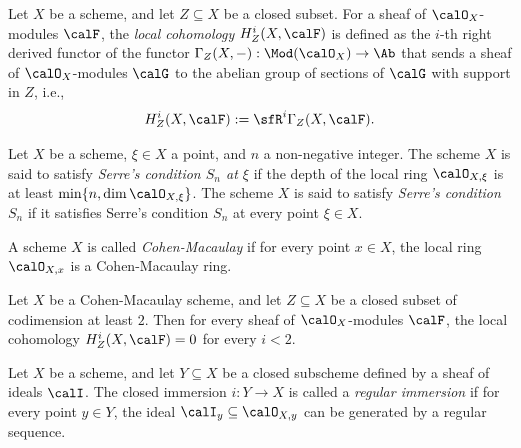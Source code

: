     \begin{definition}\label{def:local_cohomology}
        Let \(X\) be a scheme, and let \(Z\subseteq X\) be a closed subset.
        For a sheaf of \(\calO_X\)-modules \(\calF\), the \emph{local cohomology} \(H_Z^i(X,\calF)\) is defined as the \(i\)-th right derived functor of the functor \(\Gamma_Z(X,-):\Mod(\calO_X)\to \Ab\) that sends a sheaf of \(\calO_X\)-modules \(\calG\) to the abelian group of sections of \(\calG\) with support in \(Z\), i.e.,
        \[
            H_Z^i(X,\calF) := \sfR^i \Gamma_Z(X,\calF).
        \]
    \end{definition}

    \begin{definition}\label{def:Serre_condition_S_n}
        Let \(X\) be a scheme, \(\xi \in X\) a point, and \(n\) a non-negative integer.
        The scheme \(X\) is said to satisfy \emph{Serre's condition \(S_n\) at \(\xi\)} if the depth of the local ring \(\calO_{X,\xi}\) is at least \(\min\{n, \dim \calO_{X,\xi}\}\).
        The scheme \(X\) is said to satisfy \emph{Serre's condition \(S_n\)} if it satisfies Serre's condition \(S_n\) at every point \(\xi \in X\).
    \end{definition}

    \begin{definition}\label{def:Cohen-Macaulay_scheme}
        A scheme \(X\) is called \emph{Cohen-Macaulay} if for every point \(x \in X\), the local ring \(\calO_{X,x}\) is a Cohen-Macaulay ring.
    \end{definition}

    \begin{theorem}\label{thm:Cohen-Macaulay_scheme_and_vanishing_of_local_cohomology}
        Let \(X\) be a Cohen-Macaulay scheme, and let \(Z\subseteq X\) be a closed subset of codimension at least \(2\).
        Then for every sheaf of \(\calO_X\)-modules \(\calF\), the local cohomology \(H_Z^i(X,\calF) = 0\) for every \(i < 2\).
    \end{theorem}

    \begin{definition}\label{def:regular_immersion}
        Let \(X\) be a scheme, and let \(Y \subseteq X\) be a closed subscheme defined by a sheaf of ideals \(\calI\).
        The closed immersion \(i:Y \to X\) is called a \emph{regular immersion} if for every point \(y \in Y\), the ideal \(\calI_y \subseteq \calO_{X,y}\) can be generated by a regular sequence.
    \end{definition}

